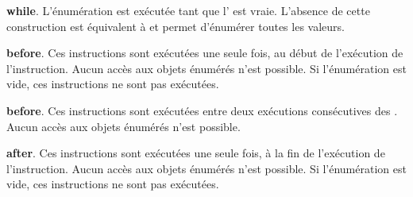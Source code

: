 \textbf{while}. L'énumération est exécutée tant que l' est vraie. L'absence de cette construction est équivalent à  et permet d'énumérer toutes les valeurs.


\textbf{before}. Ces instructions sont exécutées une seule fois, au début de l'exécution de l'instruction. Aucun accès aux objets énumérés n'est possible. Si l'énumération est vide, ces instructions ne sont pas exécutées.

\textbf{before}. Ces instructions sont exécutées entre deux exécutions consécutives des . Aucun accès aux objets énumérés n'est possible.

\textbf{after}. Ces instructions sont exécutées une seule fois, à la fin de l'exécution de l'instruction. Aucun accès aux objets énumérés n'est possible. Si l'énumération est vide, ces instructions ne sont pas exécutées.











